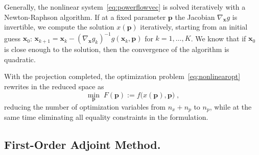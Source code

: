 Generally, the nonlinear system~\eqref{eq:powerflowvec} is solved iteratively
with a Newton-Raphson algorithm.
If at a fixed parameter $\bm{p}$ the Jacobian $\nabla_{\bm{x}}g$ is invertible,
we compute the solution $x(\bm p)$ iteratively, starting from an initial guess $\bm{x}_0$:
$\bm{x}_{k+1} = \bm{x}_k - (\nabla_{\bm{x}} g_k)^{-1} g(\bm{x}_k, \bm{p})$
for $k=1,\dots, K$.
We know that if $\bm{x}_0$ is close enough to the solution, then
the convergence of the algorithm is quadratic.

With the projection completed, the optimization problem~\eqref{eq:nonlinearopt}
rewrites in the reduced space as
\begin{equation}
  \label{eq:nonlinearoptreduced}
  \min_{\bm{p}} \; F(\bm p) := f\big(x(\bm{p}), \bm{p}\big) \; ,
\end{equation}
reducing the number of optimization variables from $n_x+n_p$ to $n_p$,
while at the same time eliminating all equality constraints in the formulation.


\subsection{First-Order Adjoint Method.}
\label{sec:background:adjoint}

